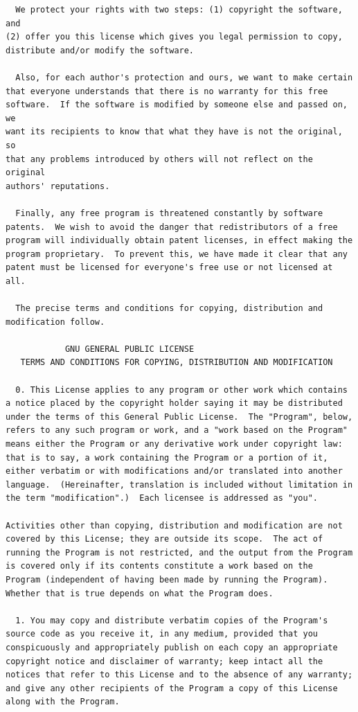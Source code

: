 \documentclass[mingoth,a4paper]{jsarticle}
\begin{document}
\begin{multicols}{2}
\begin{fontsize}{6}{6}
\begin{verbatim}
  We protect your rights with two steps: (1) copyright the software, and
(2) offer you this license which gives you legal permission to copy,
distribute and/or modify the software.

  Also, for each author's protection and ours, we want to make certain
that everyone understands that there is no warranty for this free
software.  If the software is modified by someone else and passed on, we
want its recipients to know that what they have is not the original, so
that any problems introduced by others will not reflect on the original
authors' reputations.

  Finally, any free program is threatened constantly by software
patents.  We wish to avoid the danger that redistributors of a free
program will individually obtain patent licenses, in effect making the
program proprietary.  To prevent this, we have made it clear that any
patent must be licensed for everyone's free use or not licensed at all.

  The precise terms and conditions for copying, distribution and
modification follow.

            GNU GENERAL PUBLIC LICENSE
   TERMS AND CONDITIONS FOR COPYING, DISTRIBUTION AND MODIFICATION

  0. This License applies to any program or other work which contains
a notice placed by the copyright holder saying it may be distributed
under the terms of this General Public License.  The "Program", below,
refers to any such program or work, and a "work based on the Program"
means either the Program or any derivative work under copyright law:
that is to say, a work containing the Program or a portion of it,
either verbatim or with modifications and/or translated into another
language.  (Hereinafter, translation is included without limitation in
the term "modification".)  Each licensee is addressed as "you".

Activities other than copying, distribution and modification are not
covered by this License; they are outside its scope.  The act of
running the Program is not restricted, and the output from the Program
is covered only if its contents constitute a work based on the
Program (independent of having been made by running the Program).
Whether that is true depends on what the Program does.

  1. You may copy and distribute verbatim copies of the Program's
source code as you receive it, in any medium, provided that you
conspicuously and appropriately publish on each copy an appropriate
copyright notice and disclaimer of warranty; keep intact all the
notices that refer to this License and to the absence of any warranty;
and give any other recipients of the Program a copy of this License
along with the Program.


\end{verbatim}
\end{fontsize}
\end{multicols}
\end{document}
